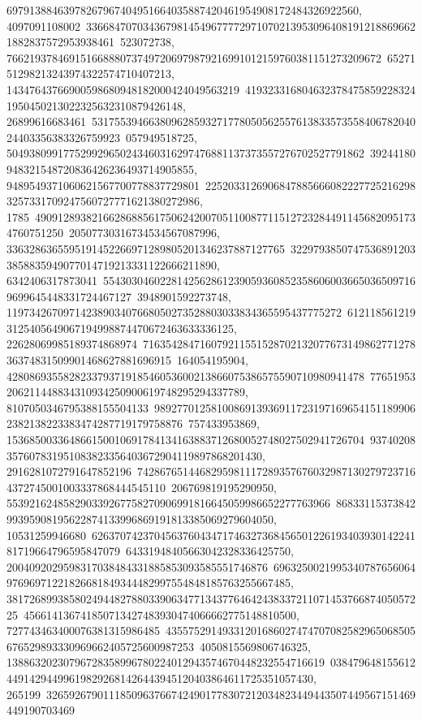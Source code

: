 {{{69791388463978267967404951664035887420461954908172484326922560, 4097091108002\
33668470703436798145496777729710702139530964081912188696621882837572953938461\
523072738, 766219378469151668880737497206979879216991012159760381151273209672\
6527151298213243974322574710407213, 14347643766900598680948182000424049563219\
4193233168046323784758592283241950450213022325632310879426148, 26899616683461\
53175539466380962859327177805056255761383357355840678204024403356383326759923\
057949518725, 504938099177529929650243460316297476881137373557276702527791862\
39244180948321548720836426236493714905855, 9489549371060621567700778837729801\
22520331269068478856660822277252162983257331709247560727771621380272986, 1785\
49091289382166286885617506242007051100877115127232844911456820951734760751250\
20507730316734534567087996, 3363286365595191452266971289805201346237887127765\
32297938507475368912033858835949077014719213331122666211890, 6342406317873041\
55430304602281425628612390593608523586060036650365097169699645448331724467127\
3948901592273748, 11973426709714238903407668050273528803033834365595437775272\
6121185612193125405649067194998874470672463633336125, 22628069985189374868974\
71635428471607921155152870213207767314986277127836374831509901468627881696915\
164054195904, 428086935582823379371918546053600213866075386575590710980941478\
77651953206211448834310934250900619748295294337789, 8107050346795388155504133\
98927701258100869139369117231971696541511899062382138223383474287719179758876\
757433953869, 153685003364866150010691784134163883712680052748027502941726704\
93740208357607831951083823356403672904119897868201430, 2916281072791647852196\
74286765144682959811172893576760329871302797237164372745001003337868444545110\
206769819195290950, 553921624858290339267758270906991816645059986652277763966\
8683311537384299395908195622874133996869191813385069279604050, 10531259946680\
62637074237045637604347174632736845650122619340393014224181719664796595847079\
64331948405663042328336425750, 2004092029598317038484331885853093585551746876\
696325002199534078765606497696971221826681849344482997554848185763255667485, 
   38172689938580249448278803390634771343776464243833721107145376687405057225\
456614136741850713427483930474066662775148810500, 727743463400076381315986485\
43557529149331201686027474707082582965068505676529893330969662405725600987253\
4050815569806746325, 13886320230796728358996780224012943574670448232554716619\
038479648155612449142944996198292681426443945120403864611725351057430, 265199\
32659267901118509637667424901778307212034823449443507449567151469449190703469\
}}}
